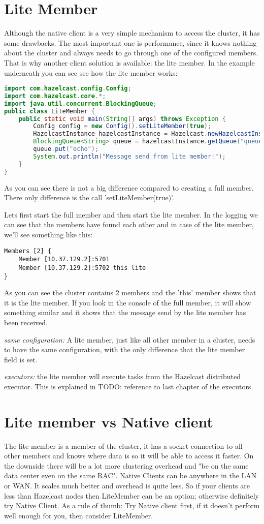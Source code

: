 \section{Lite Member}
Although the native client is a very simple mechanism to access the cluster, it has some drawbacks. The most important one is performance, since it knows nothing about the cluster and always needs to go through one of the configured members. That is why another client solution is available: the lite member. In the example underneath you can see see how the lite member works:
\begin{lstlisting}[language=java]
import com.hazelcast.config.Config;
import com.hazelcast.core.*;
import java.util.concurrent.BlockingQueue;
public class LiteMember {
    public static void main(String[] args) throws Exception {
        Config config = new Config().setLiteMember(true);
        HazelcastInstance hazelcastInstance = Hazelcast.newHazelcastInstance(config);
        BlockingQueue<String> queue = hazelcastInstance.getQueue("queue");
        queue.put("echo");
        System.out.println("Message send from lite member!");
    }
}
\end{lstlisting}
As you can see there is not a big difference compared to creating a full member. There only difference is the call 'setLiteMember(true)'. 

Lets first start the full member and then start the lite member. In the logging we can see that the members have found each other and in case of the lite member, we'll see something like this:
\begin{verbatim}
Members [2] {
    Member [10.37.129.2]:5701
    Member [10.37.129.2]:5702 this lite
}	
\end{verbatim}	
As you can see the cluster contains 2 members and the 'this' member shows that it is the lite member. If you look in the console of the full member, it will show something similar and it shows that the message send by the lite member has been received.

\emph{same configuration:} A lite member, just like all other member in a cluster, needs to have the same configuration, with the only difference that the lite member field is set. 

\emph{executors:} the lite member will execute tasks from the Hazelcast distributed executor. This is explained in TODO: reference to last chapter of the executors.

\section{Lite member vs Native client}
The lite member is a member of the cluster, it has a socket connection to all other members and knows where data is so it will be able to access it faster. On the downside there will be a lot more clustering overhead and "be on the same data center even on the same RAC". Native Clients can be anywhere in the LAN or WAN. It scales much better and overhead is quite less. So if your clients are less than Hazelcast nodes then LiteMember can be an option; otherwise definitely try Native Client. As a rule of thumb: Try Native client first, if it doesn't perform well enough for you, then consider LiteMember.

